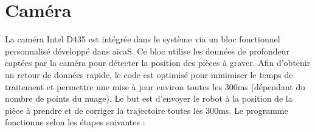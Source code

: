 \section{Caméra}
La caméra Intel D435 est intégrée dans le système via un bloc fonctionnel personnalisé développé dans \gls{aicaS}. Ce bloc utilise les données de profondeur captées par la caméra pour détecter la position des pièces à graver.
Afin d'obtenir un retour de données rapide, le code est optimisé pour minimiser le temps de traitement et permettre une mise à jour environ toutes les 300ms (dépendant du nombre de points du nuage). Le but est d'envoyer le robot à la position de la pièce à prendre et de corriger la trajectoire toutes les 300ms.
Le programme fonctionne selon les étapes suivantes :
\begin{figure}[htbp]
    \centering
    \begin{minipage}{0.55\textwidth}
        \centering
        \begin{tikzpicture}[node distance=1.8cm, every node/.style={draw, align=center, rounded corners, minimum height=1cm}]


\end{tikzpicture}
\end{minipage}
\end{figure}

